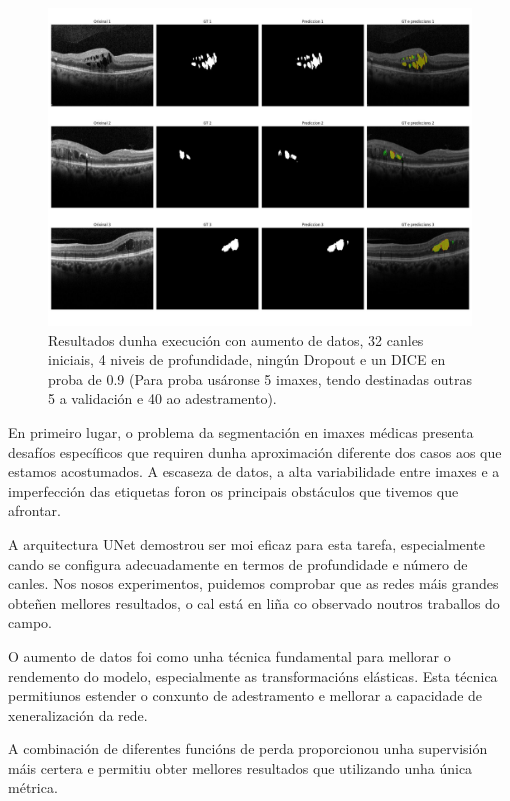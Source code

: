 \documentclass{article}
\begin{document}
\begin{figure}[H]
	\centering
	\includegraphics[width=\linewidth]{figuras/conclusion.jpg}
	\caption{Resultados dunha execución con aumento de datos, 32 canles iniciais, 4 niveis de profundidade, ningún Dropout e un DICE en proba de 0.9 (Para proba usáronse 5 imaxes, tendo destinadas outras 5 a validación e 40 ao adestramento). }
\end{figure}

En primeiro lugar, o problema da segmentación en imaxes médicas presenta desafíos específicos que requiren dunha aproximación diferente dos casos aos que estamos acostumados. A escaseza de datos, a alta variabilidade entre imaxes e a imperfección das etiquetas foron os principais obstáculos que tivemos que afrontar.

A arquitectura UNet demostrou ser moi eficaz para esta tarefa, especialmente cando se configura adecuadamente en termos de profundidade e número de canles. Nos nosos experimentos, puidemos comprobar que as redes máis grandes obteñen mellores resultados, o cal está en liña co observado noutros traballos  do campo.

O aumento de datos foi como unha técnica fundamental para mellorar o rendemento do modelo, especialmente as transformacións elásticas. Esta técnica permitiunos estender o conxunto de adestramento e mellorar a capacidade de xeneralización da rede.

A combinación de diferentes funcións de perda proporcionou unha supervisión máis certera e permitiu obter mellores resultados que utilizando unha única métrica. 
\end{document}
